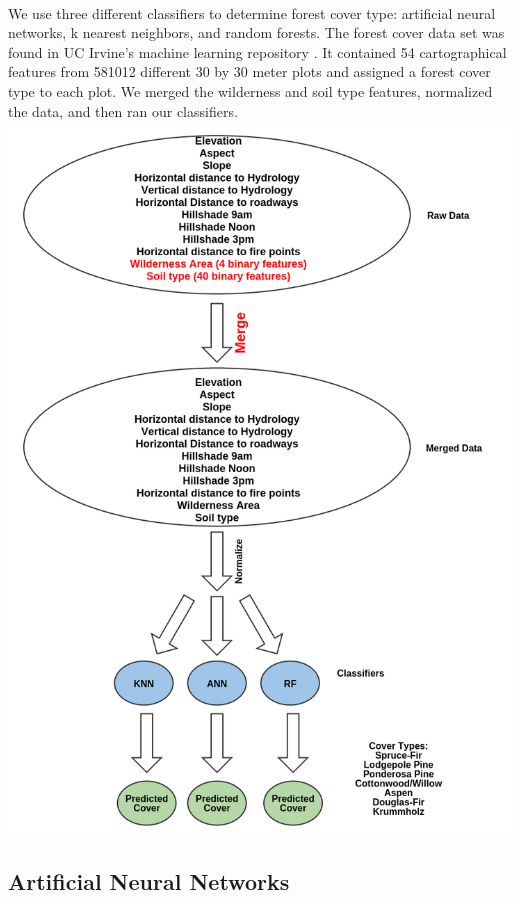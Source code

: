 \documentclass[11pt]{article}
\begin{document}
\paragraph{}
We use three different classifiers to determine forest cover type: artificial neural networks, k nearest neighbors, and random forests. The forest cover data set was found in UC Irvine's machine learning repository \cite{bache13}.  It contained 54 cartographical features from 581012 different 30 by 30 meter plots and assigned a forest cover type to each plot.  We merged the wilderness and soil type features, normalized the data, and then ran our classifiers.\\
\includegraphics[width=\linewidth]{images/flow.png}

\subsection{Artificial Neural Networks}
\end{document}
